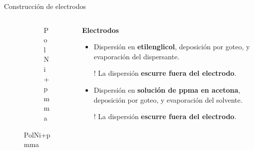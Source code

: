 \documentclass[aspectratio=169]{beamer}
\begin{document}
\begin{frame}{Construcción de electrodos}
\begin{columns}
\begin{column}{0.3\textwidth}
\begin{figure}
{\begin{subfigure}[b]{\electrodesWidth}
						\caption{PolNi+pmma}
					\end{subfigure}}
				\end{figure}
			\end{column}
			\begin{column}{0.6\textwidth}
				\textbf{Electrodos}
				\begin{itemize}[<+(1)->]
					\item Dispersión en \textbf{etilenglicol}, deposición por goteo, y evaporación del dispersante.
					\item[!] La dispersión \textbf{escurre fuera del electrodo}.
					\item Dispersión en \textbf{solución de ppma en acetona}, deposición por goteo, y evaporación del solvente.
					\item[!] La dispersión \textbf{escurre fuera del electrodo}.
				\end{itemize}
			\end{column}
		\end{columns}		
	\end{frame}
\end{document}
